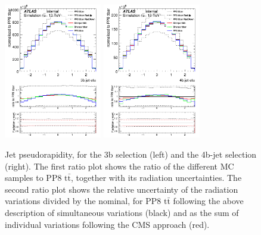 \begin{figure}[!htb]
\centering
\includegraphics[width=0.38\textwidth]{Plots/ttbb/his3b_jeteta__div}
\includegraphics[width=0.38\textwidth]{Plots/ttbb/his4b_jeteta__div}
  \caption{Jet pseudorapidity, for the 3b selection (left) and the 4b-jet selection (right). The first ratio plot shows the ratio of the different MC samples to PP8 $\mathrm{t\bar{t}}$, together with its radiation uncertainties. The second ratio plot shows the relative uncertainty of the radiation variations divided by the nominal, for PP8 $\mathrm{t\bar{t}}$ following the above description of simultaneous variations (black) and as the sum of individual variations following the CMS approach (red). \label{ttbb:jeteta}}
\end{figure}